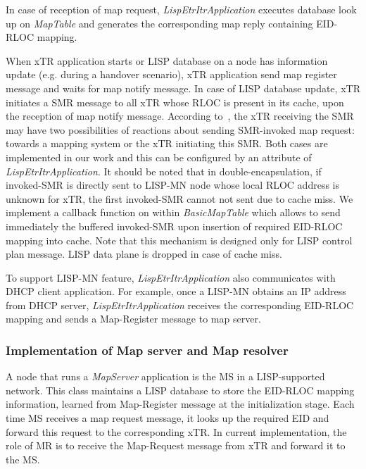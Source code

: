 In case of reception of map request, \emph{LispEtrItrApplication} executes database look up on \emph{MapTable} and generates the corresponding map reply containing EID-RLOC mapping.

When xTR application starts or LISP database on a node has information update (e.g. during a handover scenario), xTR application send map register message and waits for map notify message. In case of LISP database update, xTR initiates a SMR message to all xTR whose RLOC is present in its cache, upon the reception of map notify message. According to~\cite{rfc6830}, the xTR receiving the SMR may have two possibilities of reactions about sending SMR-invoked map request:  towards a mapping system or the xTR initiating this SMR. Both cases are implemented in our work and this can be configured by an attribute of \emph{LispEtrItrApplication}. It should be noted that in double-encapsulation, if invoked-SMR is directly sent to LISP-MN node whose local RLOC address is unknown for xTR, the first invoked-SMR cannot not sent due to cache miss. We implement a callback function on within \emph{BasicMapTable} which allows to send immediately the buffered invoked-SMR upon insertion of required EID-RLOC mapping into cache. Note that this mechanism is designed only for LISP control plan message. LISP data plane is dropped in case of cache miss.

To support LISP-MN feature, \emph{LispEtrItrApplication} also communicates with DHCP client application. For example, once a LISP-MN obtains an IP address from DHCP server, \emph{LispEtrItrApplication} receives the corresponding EID-RLOC mapping and sends a Map-Register message to map server.

\subsubsection{Implementation of Map server and Map resolver}
A node that runs a \emph{MapServer} application is the MS in a LISP-supported network. This class maintains a LISP database to store the EID-RLOC mapping information, learned from Map-Register message at the initialization stage. Each time MS receives a map request message, it looks up the required EID and forward this request to the corresponding xTR. In current implementation, the role of MR is to receive the Map-Request message from xTR and forward it to the MS.

